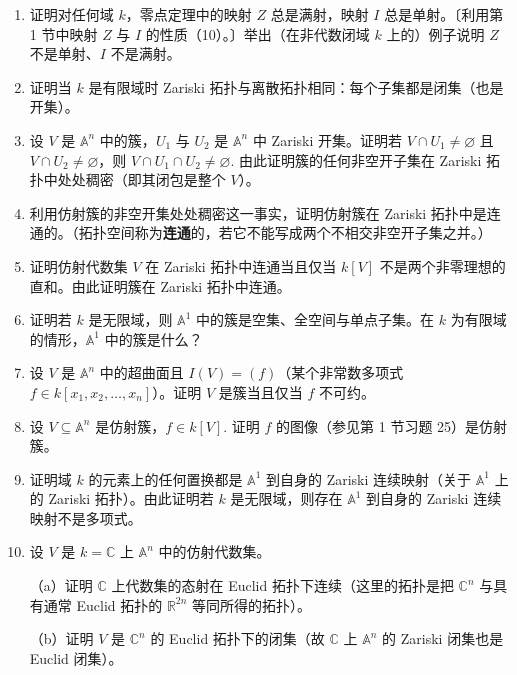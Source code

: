 \begin{enumerate}
\item 证明对任何域 \(k\)，零点定理中的映射 \(Z\) 总是满射，映射 \(I\) 总是单射。〔利用第 1 节中映射 \(Z\) 与 \(I\) 的性质（10）。〕举出（在非代数闭域 \(k\) 上的）例子说明 \(Z\) 不是单射、\(I\) 不是满射。

\item 证明当 \(k\) 是有限域时 Zariski 拓扑与离散拓扑相同：每个子集都是闭集（也是开集）。

\item 设 \(V\) 是 \(\mathbb{A}^n\) 中的簇，\(U_1\) 与 \(U_2\) 是 \(\mathbb{A}^n\) 中 Zariski 开集。证明若 \(V \cap U_1 \neq \varnothing\) 且 \(V \cap U_2 \neq \varnothing\)，则 \(V \cap U_1 \cap U_2 \neq \varnothing\). 由此证明簇的任何非空开子集在 Zariski 拓扑中处处稠密（即其闭包是整个 \(V\)）。

\item 利用仿射簇的非空开集处处稠密这一事实，证明仿射簇在 Zariski 拓扑中是连通的。（拓扑空间称为\textbf{连通}的，若它不能写成两个不相交非空开子集之并。）

\item 证明仿射代数集 \(V\) 在 Zariski 拓扑中连通当且仅当 \(k[V]\) 不是两个非零理想的直和。由此证明簇在 Zariski 拓扑中连通。

\item 证明若 \(k\) 是无限域，则 \(\mathbb{A}^1\) 中的簇是空集、全空间与单点子集。在 \(k\) 为有限域的情形，\(\mathbb{A}^1\) 中的簇是什么？

\item 设 \(V\) 是 \(\mathbb{A}^n\) 中的超曲面且 \(I(V) = (f)\)（某个非常数多项式 \(f \in k[x_1, x_2, \ldots, x_n]\)）。证明 \(V\) 是簇当且仅当 \(f\) 不可约。

\item 设 \(V \subseteq \mathbb{A}^n\) 是仿射簇，\(f \in k[V]\). 证明 \(f\) 的图像（参见第 1 节习题 25）是仿射簇。

\item 证明域 \(k\) 的元素上的任何置换都是 \(\mathbb{A}^1\) 到自身的 Zariski 连续映射（关于 \(\mathbb{A}^1\) 上的 Zariski 拓扑）。由此证明若 \(k\) 是无限域，则存在 \(\mathbb{A}^1\) 到自身的 Zariski 连续映射不是多项式。

\item 设 \(V\) 是 \(k = \mathbb{C}\) 上 \(\mathbb{A}^n\) 中的仿射代数集。

（a）证明 \(\mathbb{C}\) 上代数集的态射在 Euclid 拓扑下连续（这里的拓扑是把 \(\mathbb{C}^n\) 与具有通常 Euclid 拓扑的 \(\mathbb{R}^{2n}\) 等同所得的拓扑）。

（b）证明 \(V\) 是 \(\mathbb{C}^n\) 的 Euclid 拓扑下的闭集（故 \(\mathbb{C}\) 上 \(\mathbb{A}^n\) 的 Zariski 闭集也是 Euclid 闭集）。


\end{enumerate}
